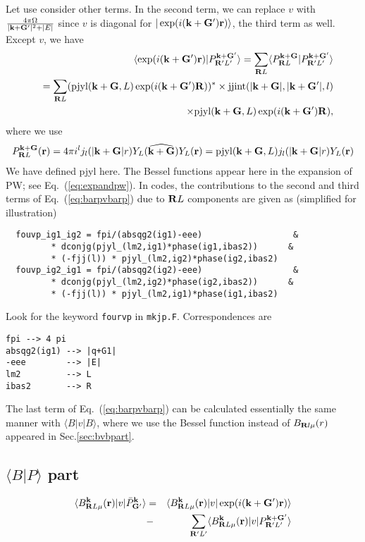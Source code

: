 \documentclass[a4paper,10pt,epsf,fleqn]{article}
\newcommand{\bfk}{{\bf k}}
\newcommand{\bfr}{{\bf r}}
\newcommand{\bfG}{{\bf G}}
\newcommand{\bfR}{{\bf R}}
\newcommand{\req}[1]{\mbox{Eq.~(\ref{#1})}}
\begin{document}
Let use consider other terms. In the second term,
we can replace $v$ with $\frac{4 \pi \Omega}{|\bfk+\bfG'|^2+|E|}$
since $v$ is diagonal for $|\exp(i(\bfk+\bfG')\bfr) \rangle$, the third term as well. Except $v$, we have
\begin{eqnarray}
&&\langle \exp(i(\bfk+\bfG')\bfr)| P^{\bfk+\bfG'}_{\bfR'{L'}}\rangle
=\sum_{\bfR{L}} \langle 
P^{\bfk+\bfG}_{\bfR{L}}|
P^{\bfk+\bfG'}_{\bfR'{L'}}\rangle \nonumber \\
&&=\sum_{\bfR{L}} 
({\rm pjyl}(\bfk+\bfG,L) \exp(i(\bfk+\bfG')\bfR))^* 
\times {\rm jjint}(|\bfk+\bfG|,|\bfk+\bfG'|,l) \nonumber \\
&&\times {\rm pjyl}(\bfk+\bfG,L) \exp(i(\bfk+\bfG')\bfR),
\end{eqnarray}
where we use 
\begin{eqnarray}
P^{\bfk+\bfG}_{\bfR{L}}(\bfr)=4 \pi i^l j_l(|{\bfk+\bfG}|r) 
Y_L(\widehat{\bfk+\bfG}) Y_L(\bfr)
={\rm pjyl}(\bfk+\bfG,L) j_l(|{\bfk+\bfG}|r) Y_L(\bfr)
\end{eqnarray}
We have defined pjyl here. 
The Bessel functions appear here in the expansion of PW; see \req{eq:expandpw}.
In codes, the contributions to the second and third terms of \req{eq:barpvbarp} due to $\bfR{L}$ components are given as (simplified for illustration) 
\begin{verbatim}
  fouvp_ig1_ig2 = fpi/(absqg2(ig1)-eee)                  &
         * dconjg(pjyl_(lm2,ig1)*phase(ig1,ibas2))      &  
         * (-fjj(l)) * pjyl_(lm2,ig2)*phase(ig2,ibas2)
  fouvp_ig2_ig1 = fpi/(absqg2(ig2)-eee)                  & 
         * dconjg(pjyl_(lm2,ig2)*phase(ig2,ibas2))      &
         * (-fjj(l)) * pjyl_(lm2,ig1)*phase(ig1,ibas2)
\end{verbatim}
Look for the keyword \verb!fourvp! in \verb!mkjp.F!.
Correspondences are
\begin{verbatim}
fpi --> 4 pi
absqg2(ig1) --> |q+G1|
-eee        --> |E|
lm2         --> L
ibas2       --> R
\end{verbatim}

The last term of \req{eq:barpvbarp} can be calculated essentially
the same manner with $\langle B| v| B\rangle$, where we use the
Bessel function instead of $B_{\bfR{l}\mu}(r)$ appeared in Sec.\ref{sec:bvbpart}.


\subsection{$\langle B|P \rangle$ part}
\begin{eqnarray}
\langle B^\bfk_{\bfR{L}\mu}(\bfr) |v| \bar{P}^\bfk_{\bfG'} \rangle
&=&\langle B^\bfk_{\bfR{L}\mu}(\bfr) |v| \exp(i(\bfk+\bfG')\bfr) \rangle
\nonumber \\
&-&\sum_{\bfR'{L'}} 
\langle B^\bfk_{\bfR{L}\mu}(\bfr) |v| P^{\bfk+\bfG'}_{\bfR'{L'}}\rangle
\label{eq:barpvbarp}
\end{eqnarray}
\end{document}
